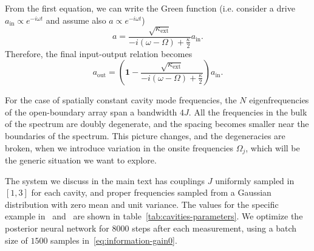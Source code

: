 \documentclass[10pt]{iopart}  %
\begin{document}
From the first equation, we can write the Green function (i.e. consider a drive $a_\text{in}\propto e^{-i\omega t}$ and assume also $a\propto e^{-i\omega t}$)
\begin{equation}
    a = \frac{\sqrt{\kappa_\text{ext}}}{-i(\omega - \Omega) + \frac{\kappa}{2}} a_\text{in}.
\end{equation}
Therefore, the final input-output relation becomes
\begin{equation}
    \label{app:eq:response}
    a_\text{out} = \left( \mathbf 1 - \frac{\sqrt{\kappa_\text{ext}}}{-i(\omega - \Omega) + \frac{\kappa}{2}}  \right) a_\text{in}.
\end{equation}

For the case of spatially constant cavity mode frequencies, the $N$ eigenfrequencies of the open-boundary array span a bandwidth $4J$.
All the frequencies in the bulk of the spectrum are doubly degenerate, and the spacing becomes smaller near the boundaries of the spectrum. This picture changes, and the degeneracies are broken, when we introduce variation in the onsite frequencies $\Omega_j$, which will be the generic situation we want to explore.



The system we discuss in the main text has couplings $J$ uniformly sampled in $[1,3]$ for each cavity, and proper frequencies sampled from a Gaussian distribution with zero mean and unit variance. The values for the specific example in~ and~ are shown in table~\ref{tab:cavities-parameters}.
We optimize the posterior neural network for $8000$ steps after each measurement, using a batch size of $1500$ samples in~\eqref{eq:information-gain0}.
\end{document}
